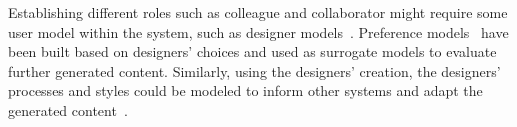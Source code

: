 Establishing different roles such as colleague and collaborator might require some user model within the system, such as designer models~\cite{liapis_designer_2013}. Preference models~\cite{alvarez_learning_2020,liapis_adapting_2012} have been built based on designers' choices and used as surrogate models to evaluate further generated content. Similarly, using the designers' creation, the designers' processes and styles could be modeled to inform other systems and adapt the generated content~\cite{liapis_designer_2014,alvarez_designer_2022,halina_threshold_2022}.



